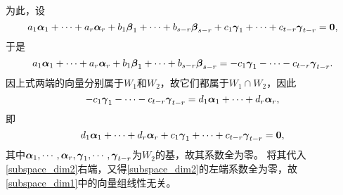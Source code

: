 \begin{frame}
    为此，设
    \begin{equation}\label{subspace_dim1}
    a_1\alphabd_1+\cd+a_r\alphabd_r + b_1\betabd_1+\cd+b_{s-r}\betabd_{s-r} + c_1\gammabd_1+\cd+c_{t-r}\gammabd_{t-r}=\M0,
    \end{equation}
    于是
    \begin{equation}\label{subspace_dim2}
    a_1\boldsymbol{\alpha}_1+\cdots+a_r\boldsymbol{\alpha}_r + b_1\boldsymbol{\beta}_1+\cdots+b_{s-r}\boldsymbol{\beta}_{s-r} = -c_1\boldsymbol{\gamma}_1-\cdots-c_{t-r}\boldsymbol{\gamma}_{t-r}.
    \end{equation}
    因上式两端的向量分别属于$W_1$和$W_2$，故它们都属于$W_1\cap W_2$，因此
    $$
    -c_1\boldsymbol{\gamma}_1-\cdots-c_{t-r}\boldsymbol{\gamma}_{t-r} = d_1\boldsymbol{\alpha}_1+\cdots+d_r\boldsymbol{\alpha}_r,
    $$
    即
    $$
    d_1\alphabd_1+\cd+d_r\alphabd_r+c_1\gammabd_1+\cd+c_{t-r}\gammabd_{t-r}=\M0,
    $$
    其中$\boldsymbol{\alpha}_1,\cdots,\boldsymbol{\alpha}_r,\boldsymbol{\gamma}_1,\cdots,\boldsymbol{\gamma}_{t-r}$为$W_2$的基，故其系数全为零。
    将其代入\eqref{subspace_dim2}右端，又得\eqref{subspace_dim2}的左端系数全为零，故\eqref{subspace_dim1}中的向量组线性无关。

\end{frame}